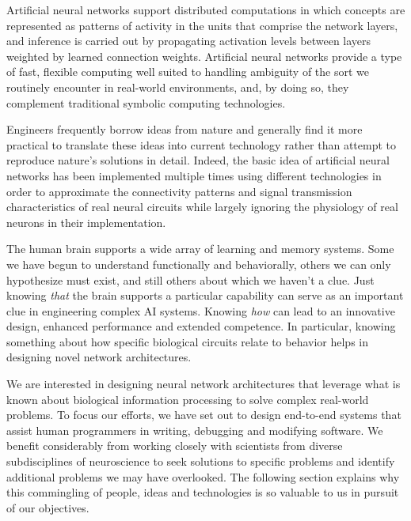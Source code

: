\documentclass[letterpaper,11pt]{article}
\begin{document}

Artificial neural networks support distributed computations in which concepts are represented as patterns of activity in the units that comprise the network layers, and inference is carried out by propagating activation levels between layers weighted by learned connection weights.  Artificial neural networks provide a type of fast, flexible computing well suited to handling ambiguity of the sort we routinely encounter in real-world environments, and, by doing so, they complement traditional symbolic computing technologies.

Engineers frequently borrow ideas from nature and generally find it more practical to translate these ideas into current technology rather than attempt to reproduce nature's solutions in detail. Indeed, the basic idea of artificial neural networks has been implemented multiple times using different technologies in order to approximate the connectivity patterns and signal transmission characteristics of real neural circuits while largely ignoring the physiology of real neurons in their implementation. 

The human brain supports a wide array of learning and memory systems. Some we have begun to understand functionally and behaviorally, others we can only hypothesize must exist, and still others about which we haven't a clue. Just knowing {\it{that}} the brain supports a particular capability can serve as an important clue in engineering complex AI systems. Knowing {\it{how}} can lead to an innovative design, enhanced performance and extended competence. In particular, knowing something about how specific biological circuits relate to behavior helps in designing novel network architectures.

We are interested in designing neural network architectures that leverage what is known about biological information processing to solve complex real-world problems. To focus our efforts, we have set out to design end-to-end systems that assist human programmers in writing, debugging and modifying software. We benefit considerably from working closely with scientists from diverse subdisciplines of neuroscience to seek solutions to specific problems and identify additional problems we may have overlooked. The following section explains why this commingling of people, ideas and technologies is so valuable to us in pursuit of our objectives.

\end{document}
